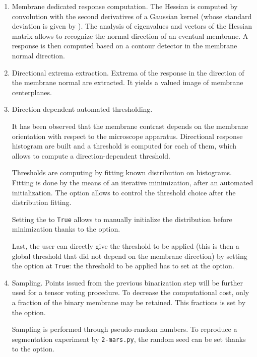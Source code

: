 \begin{enumerate}
\itemsep -0.5ex

\item Membrane dedicated response computation. The Hessian is computed by convolution with the second derivatives of a Gaussian kernel (whose standard  deviation is given by ). The analysis of eigenvalues and vectors of the Hessian matrix allows to recognize the normal direction of an eventual membrane. A response is then computed based on a contour detector in the membrane normal direction.

\item Directional extrema extraction. Extrema of the response in the direction of the membrane normal are extracted. It yields a valued image of membrane centerplanes.

\item \label{it:gace:threshold} Direction dependent automated thresholding.

It has been observed that the membrane contrast depends on the membrane orientation with respect to the microscope apparatus. Directional response histogram are built and a threshold is computed for each of them, which allows to compute a direction-dependent threshold. 

Thresholds are computing by fitting known distribution on histograms. Fitting is done by the means of an iterative minimization, after an automated initialization. The  option allows to control the threshold choice after the distribution fitting.

Setting the  to \texttt{True} allows to manually initialize the distribution before minimization thanks to the  option.

Last, the user can directly give the threshold to be applied (this is then a global threshold that did not depend on the membrane direction) by setting the  option at \texttt{True}: the threshold to be applied has to set at the  option.

\item Sampling. Points issued from the previous binarization step will be further used for a tensor voting procedure. To decrease the computational cost, only a fraction of the binary membrane may be retained. 
This fractions is set by the  option.

Sampling is performed through pseudo-random numbers. To reproduce a  segmentation experiment by \texttt{2-mars.py}, the random seed can be set thanks to the  option.


\end{enumerate}
